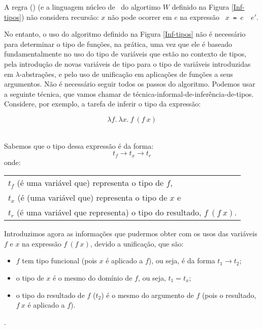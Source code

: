 A regra (\LET) (e a linguagem núcleo de \ML\ do algortimo $W$ definido
na Figura \ref{Inf-tipos}) não considera recursão: $x$ não pode
ocorrer em $e$ na expressão {\tt \llett\ $x$ = $e$ \iinn\ $e'$}.


No entanto, o uso do algoritmo definido na Figura \ref{Inf-tipos} não
é necessário para determinar o tipo de funções, na prática, uma vez
que ele é baseado fundamentalmente no uso do tipo de variáveis que
estão no contexto de tipos, pela introdução de novas variáveis de tipo
para o tipo de variáveis introduzidas em $\lambda$-abstrações, e pelo
uso de unificação em aplicações de funções a seus argumentos. Não é
necessário seguir todos os passos do algoritmo. Podemos usar a
seguinte técnica, que vamos chamar de
técnica-informal-de-inferência-de-tipos. Considere, por exemplo, a
tarefa de inferir o tipo da expressão:

\[ \lambda f.\:\lambda x.\:f\:(f\:x) \]\

Sabemos que o tipo dessa expressão é da forma:
\[ t_f \rightarrow t_x \rightarrow t_r \]
onde: \begin{tabular}[t]{l}
        $t_f$ (é uma variável que) representa o tipo de $f$,  \\
        $t_x$ (é (uma variável que) representa o tipo de $x$ e \\
        $t_r$ (é uma variável que representa) o tipo do resultado, $f\:(f\: x)$.
\end{tabular}
\newline
Introduzimos agora as informações que pudermos obter com os usos das variáveis 
$f$ e $x$ na expressão $f\:(f\:x)$, devido a unificação, que são:
\begin{itemize}
\item $f$ tem tipo funcional (pois $x$ é aplicado a $f$), ou seja, é da forma $t_1\rightarrow t_2$;
\item o tipo de $x$ é o mesmo do domínio de $f$, ou seja, $t_1 = t_x$;
\item o tipo do resultado de $f$ ($t_2$) é o mesmo do argumento de $f$ (pois o resultado, $f\:x$ é aplicado a $f$).
\end{itemize}.

